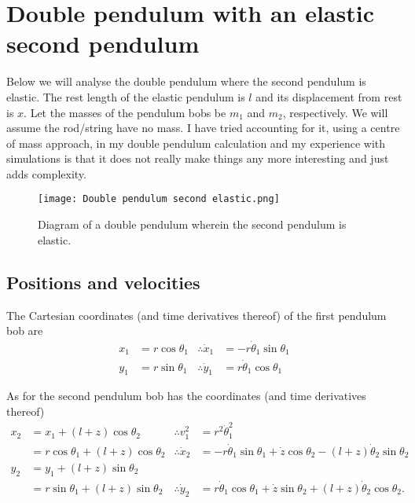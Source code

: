 \documentclass[12pt,a4paper,portrait]{article}
\begin{document}
\section{Double pendulum with an elastic second pendulum}
Below we will analyse the double pendulum where the second pendulum is elastic. The rest length of the elastic pendulum is $l$ and its displacement from rest is $x$. Let the masses of the pendulum bobs be $m_1$ and $m_2$, respectively. We will assume the rod/string have no mass. I have tried accounting for it, using a centre of mass approach, in my double pendulum calculation and my experience with simulations is that it does not really make things any more interesting and just adds complexity. 
\begin{figure}[H]
	\texttt{[image: Double pendulum second elastic.png]}
	\caption{Diagram of a double pendulum wherein the second pendulum is elastic.}
\end{figure}

\subsection{Positions and velocities}
The Cartesian coordinates (and time derivatives thereof) of the first pendulum bob are
\begin{align*}
	x_1 &= r \cos{\theta_1} &\therefore \dot{x}_1 &= -r \dot{\theta}_1 \sin{\theta_1}\\
	y_1 &= r \sin{\theta_1} &\therefore \dot{y}_1 &= r \dot{\theta}_1 \cos{\theta_1}
\end{align*}

As for the second pendulum bob has the coordinates (and time derivatives thereof)
\begin{align*}
	x_2 &= x_1 + (l+z)\cos{\theta_2} & \therefore v_1^2 &= r^2 \dot{\theta}_1^2\\
	&= r \cos{\theta_1} + (l+z)\cos{\theta_2} &\therefore \dot{x}_2 &= -r \dot{\theta}_1 \sin{\theta_1} + \dot{z} \cos{\theta_2}-(l+z)\dot{\theta}_2 \sin{\theta_2}\\
	y_2 &= y_1 + (l+z)\sin{\theta_2} \\
	&= r\sin{\theta_1} + (l+z)\sin{\theta_2} &\therefore \dot{y}_2 &= r \dot{\theta}_1 \cos{\theta_1} + \dot{z} \sin{\theta_2}+(l+z)\dot{\theta}_2 \cos{\theta_2}.
\end{align*}
\end{document}
